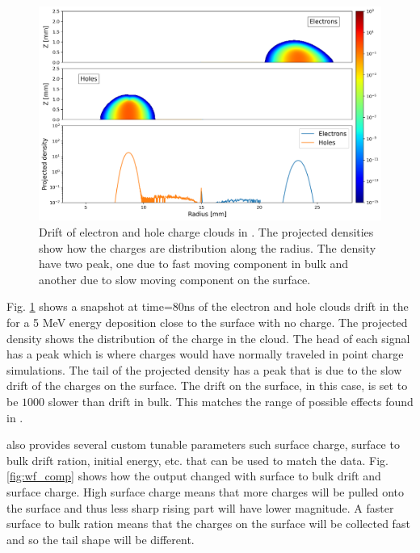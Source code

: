 
\begin{figure}[!htb]
    \includegraphics[trim={0cm 0 0cm 0},clip,width=0.99\linewidth]{ch3/figs/drift_path_sc=0.0.png}
    \caption{Drift of electron and hole charge clouds in {\tdsim}. The projected densities show how the charges are distribution along the radius. The density have two peak, one due to fast moving component in bulk and another due to slow moving component on the surface.}
    \label{ch3:fig:ehd_path_pd_sc0}
\end{figure}



Fig. \ref{ch3:fig:ehd_path_pd_sc0} shows a snapshot at time=$80$ns of the electron and hole clouds drift in the {\tdsim} for a 5 MeV energy deposition close to the surface with no charge. The projected density shows the distribution of the charge in the cloud. The head of each signal has a peak which is where charges would have normally traveled in point charge simulations. The tail of the projected density has a peak that is due to the slow drift of the charges on the surface. The drift on the surface, in this case, is set to be $1000$ slower than drift in bulk. This matches the range of possible effects found in \cite{MULLOWNEY201233}. 

{\tdsim} also provides several custom tunable parameters such surface charge, surface to bulk drift ration, initial energy, etc. that can be used to match the data. Fig. \ref{fig:wf_comp} shows how the output changed with surface to bulk drift and surface charge. High surface charge means that more charges will be pulled onto the surface and thus less sharp rising part will have lower magnitude. A faster surface to bulk ration means that the charges on the surface will be collected fast and so the tail shape will be different.

